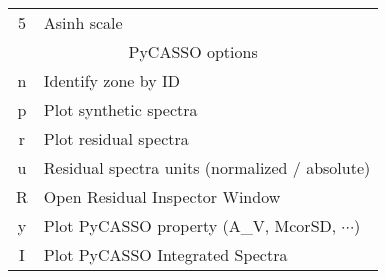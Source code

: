 \documentclass[12pt]{article}
\begin{document}
\begin{tabular} {c l}
5 & Asinh scale \\
\multicolumn{2}{c}{\cellcolor{MilkTea!25!white} PyCASSO options} \\
n & Identify zone by ID \\
p & Plot synthetic spectra \\
r & Plot residual spectra \\
u & Residual spectra units (normalized / absolute)\\
R & Open Residual Inspector Window\\
y & Plot PyCASSO property (A\_V, McorSD, $\cdots$) \\
I & Plot PyCASSO Integrated Spectra \\
\hline
\end{tabular}
\end{document}
